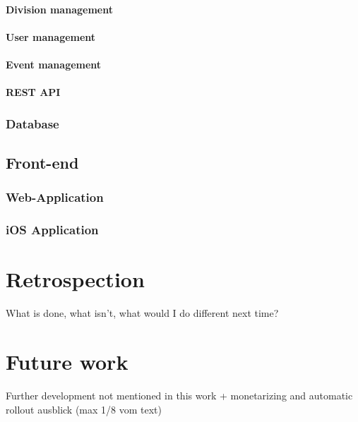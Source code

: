 \subsubsection{Division management}
\subsubsection{User management}
\subsubsection{Event management}
\subsubsection{REST API}
\subsection{Database}

\section{Front-end}
\label{sec:FrontEnd}
\subsection{Web-Application}
\subsection{iOS Application}

\chapter{Retrospection}

What is done, what isn't, what would I do different next time?

\chapter{Future work}
\label{chapter:OngoingWork}
Further development not mentioned in this work + monetarizing and automatic rollout
ausblick (max 1/8 vom text)

